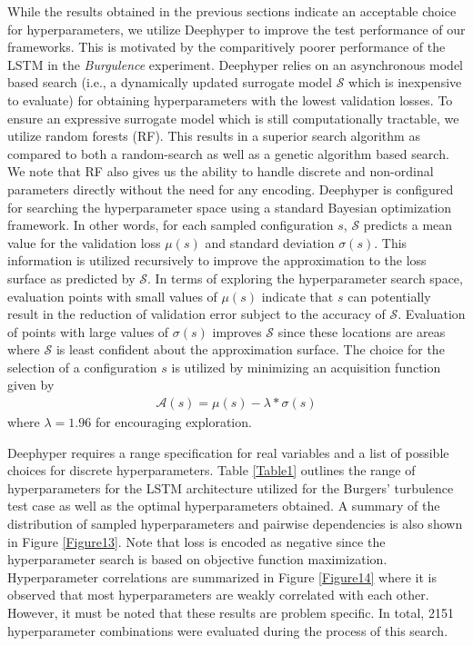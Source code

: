 \documentclass[preprint,12pt]{elsarticle}
\begin{document}
While the results obtained in the previous sections indicate an acceptable choice for hyperparameters, we utilize Deephyper \cite{balaprakash2018deephyper} to improve the test performance of our frameworks. This is motivated by the comparitively poorer performance of the LSTM in the \emph{Burgulence} experiment. Deephyper relies on an asynchronous model based search (i.e., a dynamically updated surrogate model $\mathcal{S}$ which is inexpensive to evaluate) for obtaining hyperparameters with the lowest validation losses. To ensure an expressive surrogate model which is still computationally tractable, we utilize random forests (RF). This results in a superior search algorithm as compared to both a random-search as well as a genetic algorithm based search. We note that RF also gives us the ability to handle discrete and non-ordinal parameters directly without the need for any encoding. Deephyper is configured for searching the hyperparameter space using a standard Bayesian optimization framework. In other words, for each sampled configuration $s$, $\mathcal{S}$ predicts a mean value for the validation loss $\mu(s)$ and standard deviation $\sigma(s)$. This information is utilized recursively to improve the approximation to the loss surface as predicted by $\mathcal{S}$. In terms of exploring the hyperparameter search space, evaluation points with small values of $\mu(s)$ indicate that $s$ can potentially result in the reduction of validation error subject to the accuracy of $\mathcal{S}$. Evaluation of points with large values of $\sigma(s)$ improves $\mathcal{S}$ since these locations are areas where $\mathcal{S}$ is least confident about the approximation surface. The choice for the selection of a configuration $s$ is utilized by minimizing an acquisition function given by
\begin{align}
\mathcal{A}(s)=\mu(s) - \lambda * \sigma(s)
\end{align}
where $\lambda = 1.96$ for encouraging exploration.

Deephyper requires a range specification for real variables and a list of possible choices for discrete hyperparameters. Table \ref{Table1} outlines the range of hyperparameters for the LSTM architecture utilized for the Burgers' turbulence test case as well as the optimal hyperparameters obtained. A summary of the distribution of sampled hyperparameters and pairwise dependencies is also shown in Figure \ref{Figure13}. Note that loss is encoded as negative since the hyperparameter search is based on objective function maximization. Hyperparameter correlations are summarized in Figure \ref{Figure14} where it is observed that most hyperparameters are weakly correlated with each other. However, it must be noted that these results are problem specific. In total, 2151 hyperparameter combinations were evaluated during the process of this search.
\end{document}
